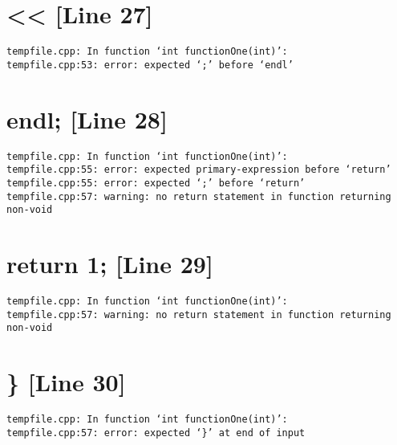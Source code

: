 \documentclass{article}
\begin{document}
\section{<< [Line 27]}
\begin{verbatim}
tempfile.cpp: In function ‘int functionOne(int)’:
tempfile.cpp:53: error: expected ‘;’ before ‘endl’

\end{verbatim}



\section{endl; [Line 28]}
\begin{verbatim}
tempfile.cpp: In function ‘int functionOne(int)’:
tempfile.cpp:55: error: expected primary-expression before ‘return’
tempfile.cpp:55: error: expected ‘;’ before ‘return’
tempfile.cpp:57: warning: no return statement in function returning non-void

\end{verbatim}



\section{return 1; [Line 29]}
\begin{verbatim}
tempfile.cpp: In function ‘int functionOne(int)’:
tempfile.cpp:57: warning: no return statement in function returning non-void

\end{verbatim}



\section{\} [Line 30]}
\begin{verbatim}
tempfile.cpp: In function ‘int functionOne(int)’:
tempfile.cpp:57: error: expected ‘}’ at end of input

\end{verbatim}
\end{document}
